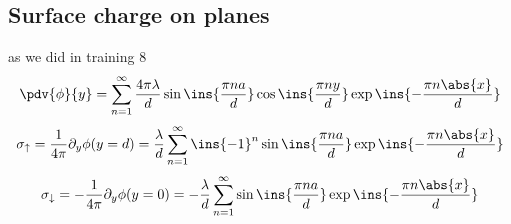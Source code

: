 \subsection{Surface charge on planes}
as we did in training 8 
\begin{equation}
	\pdv{\phi}{y} = \sum_{n=1}^{\infty}\frac{4\pi\lambda}{d}\sin\ins{\frac{\pi na}{d}}\cos\ins{\frac{\pi ny}{d}}\exp\ins{-\frac{\pi n\abs{x}}{d}}
\end{equation}
\begin{equation}
	\sigma_\uparrow = \frac{1}{4\pi}\partial_y\phi(y=d) = \frac{\lambda}{d}\sum_{n=1}^{\infty}\ins{-1}^n\sin\ins{\frac{\pi na}{d}}\exp\ins{-\frac{\pi n\abs{x}}{d}}
\end{equation}
\begin{equation}
	\sigma_\downarrow = -\frac{1}{4\pi}\partial_y\phi(y=0) = -\frac{\lambda}{d}\sum_{n=1}^{\infty}\sin\ins{\frac{\pi na}{d}}\exp\ins{-\frac{\pi n\abs{x}}{d}}
\end{equation}